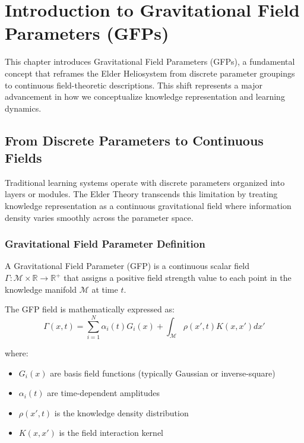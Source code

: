 \chapter{Introduction to Gravitational Field Parameters (GFPs)}

This chapter introduces Gravitational Field Parameters (GFPs), a fundamental concept that reframes the Elder Heliosystem from discrete parameter groupings to continuous field-theoretic descriptions. This shift represents a major advancement in how we conceptualize knowledge representation and learning dynamics.

\section{From Discrete Parameters to Continuous Fields}

Traditional learning systems operate with discrete parameters organized into layers or modules. The Elder Theory transcends this limitation by treating knowledge representation as a continuous gravitational field where information density varies smoothly across the parameter space.

\subsection{Gravitational Field Parameter Definition}

\begin{definition}
A Gravitational Field Parameter (GFP) is a continuous scalar field $\Gamma: \mathcal{M} \times \mathbb{R} \to \mathbb{R}^+$ that assigns a positive field strength value to each point in the knowledge manifold $\mathcal{M}$ at time $t$.
\end{definition}

The GFP field is mathematically expressed as:
\begin{equation}
\Gamma(x, t) = \sum_{i=1}^{N} \alpha_i(t) G_i(x) + \int_{\mathcal{M}} \rho(x', t) K(x, x') dx'
\end{equation}

where:
\begin{itemize}
    \item $G_i(x)$ are basis field functions (typically Gaussian or inverse-square)
    \item $\alpha_i(t)$ are time-dependent amplitudes
    \item $\rho(x', t)$ is the knowledge density distribution
    \item $K(x, x')$ is the field interaction kernel
\end{itemize}

